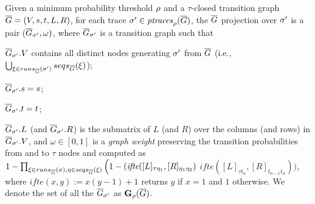 	\begin{definition}
		Given a minimum probability thre\-shold $\pmin$ and a $\tau$-closed transition graph $\closed{G}=(V,s,t,L,R)$, for each trace $\nonlogtrace\in\ptraces{\closed{G}}{\pmin}$, the $\closed{G}$ projection over $\nonlogtrace$ is a pair ($\closed{G}_\nonlogtrace,\omega)$, where $\closed{G}_\nonlogtrace$ is a transition graph such that
\begin{inparaenum}[\it (i)]
	\item $\closed{G}_\nonlogtrace.V$ contains all distinct nodes generating $\nonlogtrace$ from $\closed{G}$	(i.e., $\bigcup_{\xi\in\runs{\nonlogtrace}{\closed{G}}}\seqs{\xi}{ \closed{G}}$);
	\item $\closed{G}_\nonlogtrace.s = s$;
	\item  $\closed{G}_\nonlogtrace.t = t$;
	\item $\closed{G}_\nonlogtrace.L$ (and $\closed{G}_\nonlogtrace.R$) is the submatrix of $L$ (and $R$) over the columns (and rows) in $\closed{G}_\nonlogtrace.V$, and $\omega \in [0,1]$ is a \emph{graph weight} preserving the transition probabilities from and to $\tau$ nodes and computed as $1-\prod_{\xi\in\runs{\sigma}{\closed{G}},\eta\in\seqs{\xi}{\closed{G}}}\Big(1-(\textit{ifte}([L]_{\tau\eta_1},[R]_{\eta_1\eta_2})$
	 $\textit{ifte}([L]_{\tau t_n},[R]_{t_{n-1} t_n})\Big)$,
	where $\textit{ifte}(x,y):=x(y-1)+1$ returns $y$ if $x=1$ and $1$ otherwise. We denote the set of all the $\closed{G}_\nonlogtrace$ as $\TBf{\pmin}{4}(\closed{G})$.
\end{inparaenum}
%		
\end{definition}
